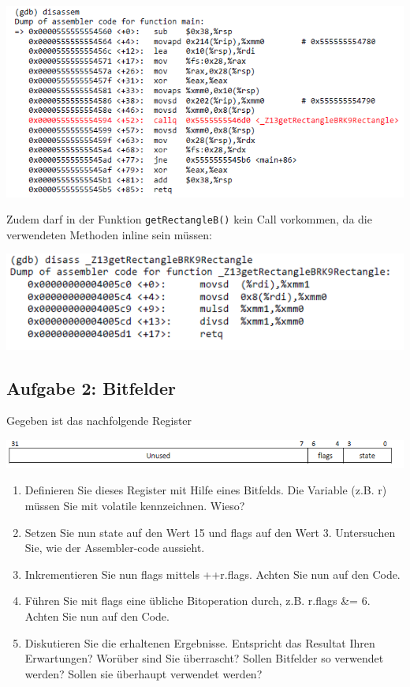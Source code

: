 \begin{enumerate}
\begin{center}
  \includegraphics[width=.8\linewidth]{900-Praktika/prak07/5.PNG}
\end{center}


Zudem darf in der Funktion \texttt{getRectangleB()} kein Call vorkommen, da die verwendeten Methoden inline sein müssen:

\begin{center}
  \includegraphics[width=.8\linewidth]{900-Praktika/prak07/6.PNG}
\end{center}

\end{enumerate}

\subsection{Aufgabe 2: Bitfelder}

Gegeben ist das nachfolgende Register

\begin{center}
  \includegraphics[width=.8\linewidth]{900-Praktika/prak07/bitmuster.PNG}
\end{center}


\begin{enumerate}
  \item Definieren Sie dieses Register mit Hilfe eines Bitfelds. Die Variable (z.B. r) müssen Sie mit volatile kennzeichnen. Wieso?
\item Setzen Sie nun state auf den Wert 15 und flags auf den Wert 3. Untersuchen Sie, wie der Assembler-code aussieht.
\item Inkrementieren Sie nun flags mittels ++r.flags. Achten Sie nun auf den Code.
\item Führen Sie mit flags eine übliche Bitoperation durch, z.B. r.flags \&= 6. Achten Sie nun auf den Code.
\item Diskutieren Sie die erhaltenen Ergebnisse. Entspricht das Resultat Ihren Erwartungen? Worüber sind Sie überrascht? Sollen Bitfelder so verwendet werden? Sollen sie überhaupt verwendet werden?
\end{enumerate}

